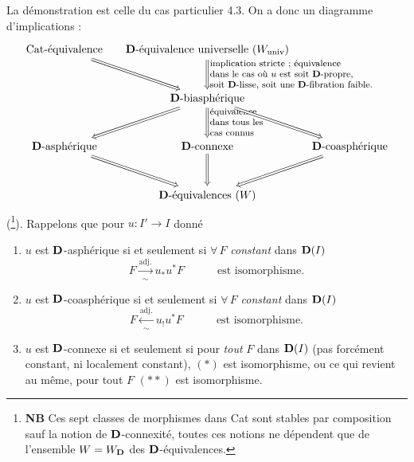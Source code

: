 La démonstration est celle du cas particulier 4.3. On a donc un diagramme d'implications :
\[
\begin{tikzcd}[column sep=small, row sep=large]
\text{Cat-équivalence} \ar[dr, Rightarrow] & \D\text{-équivalence universelle } (W_{\mathrm{univ}}) \ar[d, Rightarrow, "{\text{\footnotesize\begin{tabular}{@{}l@{}}implication stricte ; équivalence\\ dans le cas où $u$ est soit $\mathbf{D}$-propre,\\ soit $\mathbf{D}$-lisse, soit une $\mathbf{D}$-fibration faible.\end{tabular}}}"] & \\
 & \D\text{-biasphérique} \ar[dl, Rightarrow] \ar[d, Rightarrow, "{\text{\footnotesize\begin{tabular}{@{}l@{}}équivalence\\ dans tous les\\ cas connus\end{tabular}}}"] \ar[dr, Rightarrow] & \\
\D\text{-asphérique} \ar[dr, Rightarrow] & \D\text{-connexe} \ar[d, Rightarrow] & \D\text{-coasphérique} \ar[dl, Rightarrow] \\
 & \D\text{-équivalences } (W) &
\end{tikzcd}
\]
(\footnote{\textbf{NB} Ces sept classes de morphismes dans Cat sont stables par composition sauf la notion de $\mathbf{D}$-connexité, toutes ces notions ne dépendent que de l'ensemble $W = W_{\mathbf{D}}$ des $\mathbf{D}$-équivalences.}). Rappelons que pour $u : I' \longrightarrow I$ donné
\begin{enumerate}[leftmargin=*, labelindent=1.5em]
\item[a)] $u$ est $\mathbf{D}$-asphérique si et seulement si $\forall\, F$ \textit{constant} dans $\mathbf{D}(I)$
\[
F \xrightarrow[\sim]{\text{adj.}} u_*u^*F \qquad\quad \text{est isomorphisme.} \tag*{$(\ast)$}
\]
\item[b)] $u$ est $\mathbf{D}$-coasphérique si et seulement si $\forall\, F$ \textit{constant} dans $\mathbf{D}(I)$
\[
F \xleftarrow[\sim]{\text{adj.}} u_!u^*F \qquad\quad \text{est isomorphisme.} \tag*{$(\ast\ast)$}
\]
\item[c)] $u$ est $\mathbf{D}$-connexe si et seulement si pour \textit{tout} $F$ dans $\mathbf{D}(I)$ (pas forcément constant, ni localement constant), $(\ast)$ est isomorphisme, ou ce qui revient au même, pour tout $F$ $(\ast\ast)$ est isomorphisme.
\end{enumerate}

